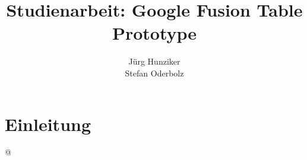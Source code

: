 

\title{\textbf{Studienarbeit: Google Fusion Table Prototype}}
\author{Jürg Hunziker\\
		Stefan Oderbolz}
\date{}


\maketitle

\chapter{Einleitung}
\label{chp:einleitung}


@